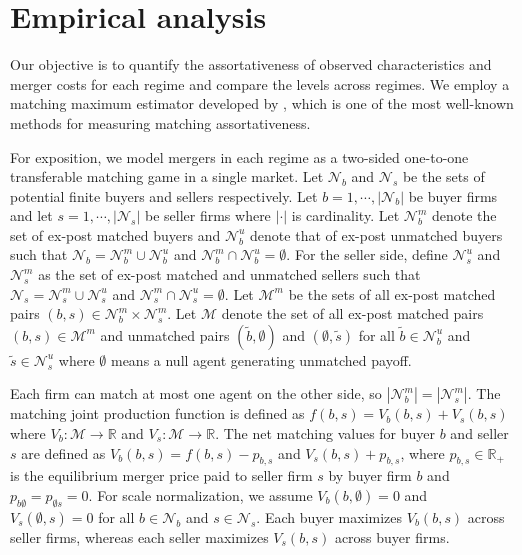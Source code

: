 \documentclass[10pt]{article}
\begin{document}

\section{Empirical analysis}\label{sec:empirical_analysis}

Our objective is to quantify the assortativeness of observed characteristics and merger costs for each regime and compare the levels across regimes. We employ a matching maximum estimator developed by \cite{fox2018estimating}, which is one of the most well-known methods for measuring matching assortativeness.

For exposition, we model mergers in each regime as a two-sided one-to-one transferable matching game in a single market. Let $\mathcal{N}_b$ and $\mathcal{N}_s$ be the sets of potential finite buyers and sellers respectively. Let $b=1,\cdots,|\mathcal{N}_b|$ be buyer firms and let $s=1,\cdots,|\mathcal{N}_s|$ be seller firms where $|\cdot|$ is cardinality. Let $\mathcal{N}_{b}^{m}$ denote the set of ex-post matched buyers and $\mathcal{N}_{b}^{u}$ denote that of ex-post unmatched buyers such that $\mathcal{N}_b= \mathcal{N}_{b}^{m}\cup\mathcal{N}_{b}^{u}$ and $\mathcal{N}_{b}^{m}\cap\mathcal{N}_{b}^{u}=\emptyset$. For the seller side, define $\mathcal{N}_{s}^{u}$ and $\mathcal{N}_{s}^{m}$ as the set of ex-post matched and unmatched sellers such that $\mathcal{N}_s= \mathcal{N}_{s}^{m}\cup\mathcal{N}_{s}^{u}$ and $\mathcal{N}_{s}^{m}\cap\mathcal{N}_{s}^{u}=\emptyset$. Let $\mathcal{M}^m$ be the sets of all ex-post matched pairs $(b,s)\in\mathcal{N}_{b}^{m}\times \mathcal{N}_{s}^{m}$. Let $\mathcal{M}$ denote the set of all ex-post matched pairs $(b,s)\in\mathcal{M}^{m}$ and unmatched pairs $(\tilde{b},\emptyset)$ and $(\emptyset,\tilde{s})$ for all $\tilde{b}\in \mathcal{N}_b^u$ and $\tilde{s}\in \mathcal{N}_s^u$ where $\emptyset$ means a null agent generating unmatched payoff. 

Each firm can match at most one agent on the other side, so  $|\mathcal{N}_b^{m}|=|\mathcal{N}_s^{m}|$. The matching joint production function is defined as $f(b,s)=V_b(b,s)+V_s(b,s)$ where $V_b:\mathcal{M}\rightarrow \mathbb{R}$ and $V_s:\mathcal{M}\rightarrow \mathbb{R}$. The net matching values for buyer $b$ and seller $s$ are defined as $V_b(b,s)=f(b,s)-p_{b,s}$ and $V_s(b,s)+p_{b,s}$, where $p_{b,s}\in \mathbb{R}_{+}$ is the equilibrium merger price paid to seller firm $s$ by buyer firm $b$ and $p_{b\emptyset}=p_{\emptyset s}=0$. For scale normalization, we assume $V_b(b,\emptyset)=0$ and $V_s(\emptyset,s)=0$ for all $b\in \mathcal{N}_b$ and $s\in \mathcal{N}_s$. Each buyer maximizes $V_b(b,s)$ across seller firms, whereas each seller maximizes $V_s(b,s)$ across buyer firms. 
\end{document}
